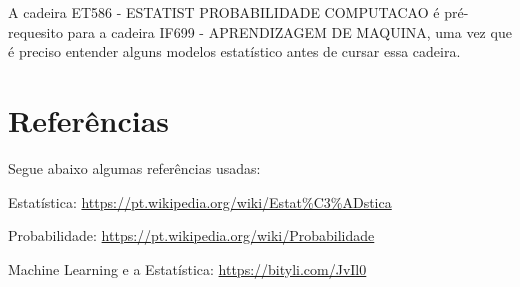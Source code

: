 \documentclass{article}
\begin{document}
\par A cadeira ET586 - ESTATIST PROBABILIDADE COMPUTACAO é pré-requesito para a cadeira IF699 - APRENDIZAGEM DE MAQUINA, uma vez que é preciso entender alguns modelos estatístico antes de cursar essa cadeira.

\section{Referências}

Segue abaixo algumas referências usadas:

\par Estatística: 
\url{https://pt.wikipedia.org/wiki/Estat%C3%ADstica}

\par Probabilidade:
\url{https://pt.wikipedia.org/wiki/Probabilidade}

\par Machine Learning e a Estatística:
\url{https://bityli.com/JvIl0}
\end{document}
